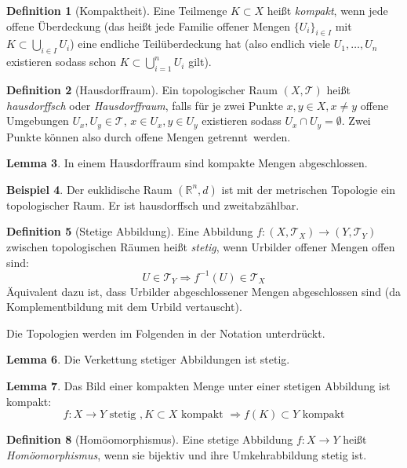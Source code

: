 \documentclass[a4paper]{scrreprt}
\numberwithin{equation}{chapter}
\newcommand{\R}{\mathbb{R}}
\theoremstyle{definition}
\newtheorem{defn}{Definition}[section]
\newtheorem{lemma}[defn]{Lemma}
\newtheorem{bsp}[defn]{Beispiel}
\begin{document}
		\begin{defn}[Kompaktheit]
			Eine Teilmenge $K\subset X$ heißt \emph{kompakt}, wenn jede offene Überdeckung (das heißt jede Familie offener Mengen $\lbrace U_i\rbrace_{i\in I}$ mit $K\subset \bigcup_{i\in I}U_i$) eine endliche Teilüberdeckung hat (also endlich viele $U_1,\ldots,U_n$ existieren sodass schon $K\subset \bigcup_{i=1}^n U_i$ gilt).
		\end{defn}
		\begin{defn}[Hausdorffraum]
			Ein topologischer Raum $(X,\mathcal{T})$ heißt \emph{hausdorffsch} oder \emph{Hausdorffraum}, falls für je zwei Punkte $x,y\in X, x\neq y$ offene Umgebungen ${U_x,U_y\in\mathcal{T}}$, ${x\in U_x}, {y\in U_y}$ existieren sodass $U_x\cap U_y=\emptyset$. Zwei Punkte können also durch offene Mengen \glqq getrennt\grqq\ werden.
		\end{defn}
		\begin{lemma}
			In einem Hausdorffraum sind kompakte Mengen abgeschlossen.
		\end{lemma}
		\begin{bsp}
			Der euklidische Raum $(\R^n,d)$ ist mit der metrischen Topologie ein topologischer Raum. Er ist hausdorffsch und zweitabzählbar.
		\end{bsp}
		\begin{defn}[Stetige Abbildung]
			Eine Abbildung $f\colon (X,\mathcal{T}_X)\rightarrow (Y,\mathcal{T}_Y)$ zwischen topologischen Räumen heißt \emph{stetig}, wenn Urbilder offener Mengen offen sind:
			\begin{equation*}
				U\in\mathcal{T}_Y \Rightarrow f^{-1}(U)\in\mathcal{T}_X
			\end{equation*}
			Äquivalent dazu ist, dass Urbilder abgeschlossener Mengen abgeschlossen sind (da Komplementbildung mit dem Urbild vertauscht).
		\end{defn}
		Die Topologien werden im Folgenden in der Notation unterdrückt.
		\begin{lemma}
			Die Verkettung stetiger Abbildungen ist stetig.
		\end{lemma}
		\begin{lemma}
			Das Bild einer kompakten Menge unter einer stetigen Abbildung ist kompakt:
			\begin{equation*}
				f\colon X\rightarrow Y \text{ stetig }, K\subset X \text{ kompakt }\Rightarrow f(K)\subset Y \text{ kompakt}
			\end{equation*}
		\end{lemma}
		\begin{defn}[Homöomorphismus]
			Eine stetige Abbildung $f\colon X\rightarrow Y$ heißt \emph{Homöomorphismus}, wenn sie bijektiv und ihre Umkehrabbildung stetig ist.
		\end{defn}
\end{document}
